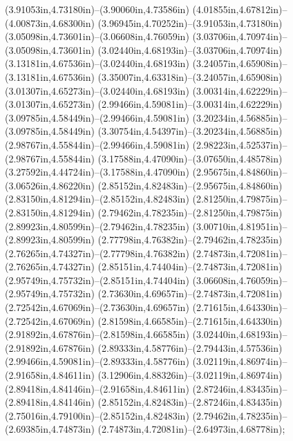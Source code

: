 (3.91053in,4.73180in)--(3.90060in,4.73586in) (4.01855in,4.67812in)--(4.00873in,4.68300in) (3.96945in,4.70252in)--(3.91053in,4.73180in) (3.05098in,4.73601in)--(3.06608in,4.76059in) (3.03706in,4.70974in)--(3.05098in,4.73601in) (3.02440in,4.68193in)--(3.03706in,4.70974in) (3.13181in,4.67536in)--(3.02440in,4.68193in) (3.24057in,4.65908in)--(3.13181in,4.67536in) (3.35007in,4.63318in)--(3.24057in,4.65908in) (3.01307in,4.65273in)--(3.02440in,4.68193in) (3.00314in,4.62229in)--(3.01307in,4.65273in) (2.99466in,4.59081in)--(3.00314in,4.62229in) (3.09785in,4.58449in)--(2.99466in,4.59081in) (3.20234in,4.56885in)--(3.09785in,4.58449in) (3.30754in,4.54397in)--(3.20234in,4.56885in) (2.98767in,4.55844in)--(2.99466in,4.59081in) (2.98223in,4.52537in)--(2.98767in,4.55844in) (3.17588in,4.47090in)--(3.07650in,4.48578in) (3.27592in,4.44724in)--(3.17588in,4.47090in) (2.95675in,4.84860in)--(3.06526in,4.86220in) (2.85152in,4.82483in)--(2.95675in,4.84860in) (2.83150in,4.81294in)--(2.85152in,4.82483in) (2.81250in,4.79875in)--(2.83150in,4.81294in) (2.79462in,4.78235in)--(2.81250in,4.79875in) (2.89923in,4.80599in)--(2.79462in,4.78235in) (3.00710in,4.81951in)--(2.89923in,4.80599in) (2.77798in,4.76382in)--(2.79462in,4.78235in) (2.76265in,4.74327in)--(2.77798in,4.76382in) (2.74873in,4.72081in)--(2.76265in,4.74327in) (2.85151in,4.74404in)--(2.74873in,4.72081in) (2.95749in,4.75732in)--(2.85151in,4.74404in) (3.06608in,4.76059in)--(2.95749in,4.75732in) (2.73630in,4.69657in)--(2.74873in,4.72081in) (2.72542in,4.67069in)--(2.73630in,4.69657in) (2.71615in,4.64330in)--(2.72542in,4.67069in) (2.81598in,4.66585in)--(2.71615in,4.64330in) (2.91892in,4.67876in)--(2.81598in,4.66585in) (3.02440in,4.68193in)--(2.91892in,4.67876in) (2.89333in,4.58776in)--(2.79443in,4.57536in) (2.99466in,4.59081in)--(2.89333in,4.58776in) (3.02119in,4.86974in)--(2.91658in,4.84611in) (3.12906in,4.88326in)--(3.02119in,4.86974in) (2.89418in,4.84146in)--(2.91658in,4.84611in) (2.87246in,4.83435in)--(2.89418in,4.84146in) (2.85152in,4.82483in)--(2.87246in,4.83435in) (2.75016in,4.79100in)--(2.85152in,4.82483in) (2.79462in,4.78235in)--(2.69385in,4.74873in) (2.74873in,4.72081in)--(2.64973in,4.68778in);
